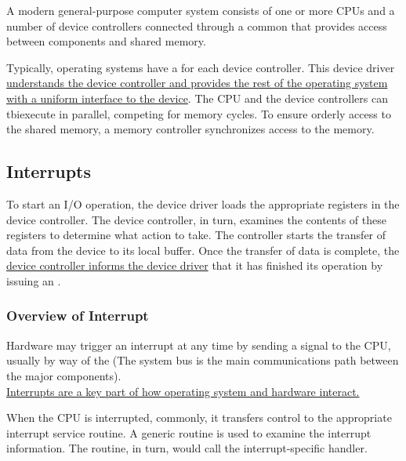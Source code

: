 \hf A modern general-purpose computer system consists of one or more CPUs and
a number of device controllers connected through a common  that provides
access between components and shared memory.


Typically, operating systems have a  for each device controller. This device
driver \underline{understands the device controller and provides the rest of the operating system with a uniform interface to the device}. The CPU and the device controllers can tbi{execute in parallel}, competing for memory cycles. To ensure orderly access to the shared memory, a memory controller synchronizes access to the memory. 


\subsection{Interrupts}

\hf To start an I/O operation, the device driver loads the appropriate registers in the device
controller. The device controller, in turn, examines the contents of these registers to determine what action to take. The controller starts the transfer of data from the device to its local buffer. Once the transfer of data is complete, the \underline{device controller informs the device driver} that it has finished its operation by issuing an .

\subsubsection{Overview of Interrupt}

\hf Hardware may trigger an interrupt at any time by sending a signal to the CPU, usually by way of the  (The system bus is the main communications path between the major components).\\

\underline{Interrupts are a key part of how operating system and hardware interact.}



When the CPU is interrupted, commonly, it transfers control to the appropriate interrupt service routine. A generic routine is used to examine the interrupt information. The routine, in turn, would call the interrupt-specific handler.\\


